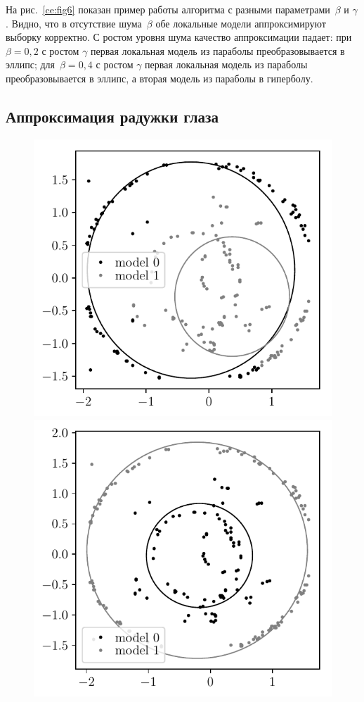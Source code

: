 \documentclass[12pt]{a&t}
\begin{document}
На рис.~\ref{ce:fig6} показан пример работы алгоритма с разными параметрами~$\beta$ и $\gamma$. Видно, что в отсутствие шума~$\beta$ обе локальные модели аппроксимируют выборку корректно. С ростом уровня шума качество аппроксимации падает: при~$\beta = 0 {,}2$ с ростом $\gamma$ первая локальная модель из параболы преобразовывается в эллипс; для~$\beta=0 {,}4$ с ростом $\gamma$ первая локальная модель из параболы преобразовывается в эллипс, а вторая модель из параболы в гиперболу.

\subsection{Аппроксимация радужки глаза}
\begin{figure}[h!]
\begin{center}
	\includegraphics[height = 0.17\textheight]{not_prior_real_example}
	\includegraphics[height = 0.17\textheight]{prior_real_example}

\end{center}
\end{figure}
\end{document}
